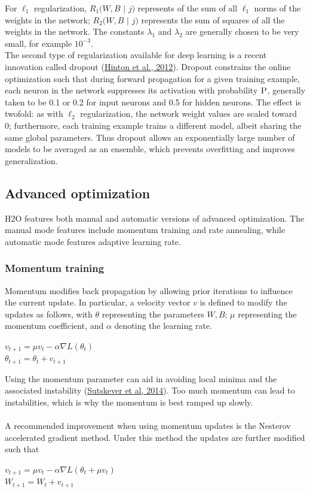 \documentclass[11pt]{article}
\begin{document}
For $\ell_1$ regularization, $R_1(W,B$ $|$ $j)$ represents of the sum of all $\ell_1$ norms of the weights in the network; $R_2(W,B$ $|$ $j)$ represents the sum of squares of all the weights in the network. The constants $\lambda_1$ and $\lambda_2$ are generally chosen to be very small, for example $10^{-3}$. 
\\
The second type of regularization available for deep learning is a recent innovation called dropout (\href{http://arxiv.org/pdf/1207.0580.pdf}{Hinton et al., 2012}). Dropout constrains the online optimization such that during forward propagation for a given training example, each neuron in the network suppresses its activation with probability $\textsc{P}$, generally taken to be 0.1 or 0.2 for input neurons and 0.5 for hidden neurons. The effect is twofold: as with $\ell_2$ regularization, the network weight values are scaled toward 0; furthermore, each training example trains a different model, albeit sharing the same global parameters. Thus dropout allows an exponentially large number of models to be averaged as an ensemble, which prevents overfitting and improves generalization. 

\subsection{Advanced optimization} \label{2.4}
H2O features both manual and automatic versions of advanced optimization. The manual mode features include momentum training and rate annealing, while automatic mode features adaptive learning rate.
\subsubsection{Momentum training} \label{2.4.1}
Momentum modifies back propagation by allowing prior iterations to influence the current update. In particular, a velocity vector $v$ is defined to modify the updates as follows, with $\theta$ representing the parameters $W,B$; $\mu$ representing the momentum coefficient, and $\alpha$ denoting 
the learning rate. 
\begin{center}
$v_{t+1} = \mu v_t - \alpha \nabla L(\theta_t)$
\\
$\theta_{t+1} = \theta_t + v_{t+1}$
\end{center}
Using the momentum parameter can aid in avoiding 
local minima and the associated instability (\href{http://www.cs.toronto.edu/~fritz/absps/momentum.pdf}{Sutskever et al, 2014}). Too much momentum can lead to instabilities, which is why the momentum is best ramped up slowly.
\\
\\
A recommended improvement when using momentum updates is the Nesterov accelerated gradient method. Under this method the updates are further modified such that 
\begin{center}
$v_{t+1} = \mu v_t - \alpha \nabla L(\theta_t + \mu v_t)$
\\
$W_{t+1} = W_t + v_{t+1}$
\end{center}
\end{document}
